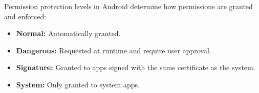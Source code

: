 \documentclass[11pt]{article}
\begin{document}
\begin{enumerate}
    Permission protection levels in Android determine how permissions are granted and enforced:
    
    \begin{itemize}
        \item \textbf{Normal:} Automatically granted.
        \item \textbf{Dangerous:} Requested at runtime and require user approval.
        \item \textbf{Signature:} Granted to apps signed with the same certificate as the system.
        \item \textbf{System:} Only granted to system apps.
    \end{itemize}
    
\end{enumerate}
\end{document}
